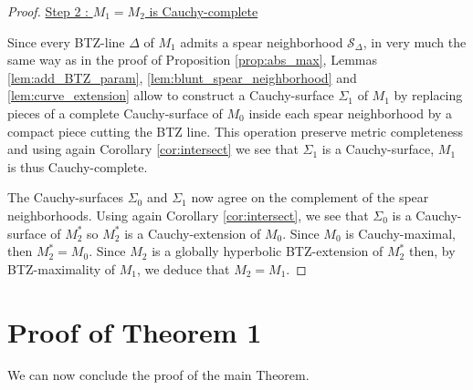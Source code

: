 \documentclass[a4paper,12pt]{article}
\def\S{\mathcal S}
\def\S{\mathcal{S}}
\begin{document}
\begin{proof}
				  \item \underline{Step 2 : $M_1=M_2$ is Cauchy-complete}
				  
				  Since every BTZ-line $\Delta$ of $M_1$ admits a spear neighborhood 
				  $\S_{\Delta}$, in very much the same way as in the proof of Proposition \ref{prop:abs_max}, Lemmas \ref{lem:add_BTZ_param}, \ref{lem:blunt_spear_neighborhood} and \ref{lem:curve_extension}  allow to construct a Cauchy-surface $\Sigma_1$ of $M_1$ by replacing pieces of a complete Cauchy-surface of $M_0$ inside each spear neighborhood by a compact piece cutting the BTZ line. This operation preserve metric completeness and using again Corollary  \ref{cor:intersect} we see that $\Sigma_1$ is a Cauchy-surface, $M_1$ is thus Cauchy-complete.
				  
                  The Cauchy-surfaces $\Sigma_0$ and $\Sigma_1$ now agree on the complement of the spear neighborhoods. Using again Corollary \ref{cor:intersect}, we see that $\Sigma_0$ is a Cauchy-surface of $M_2^*$ so $M_2^*$ is a Cauchy-extension of $M_0$. Since $M_0$ is Cauchy-maximal, then $M_2^*=M_0$. Since $M_2$ is a globally hyperbolic BTZ-extension of $M_2^*$ then, by BTZ-maximality of $M_1$, we deduce that $M_2= M_1$.
				  
				  
				  
				  
				  
				  
				  
				  
				  
				  
				  
				  

				
				  
				  
				  
				  
				  
				  
				  
				  
				  
				  
				  
				\end{proof}

				

				
			

\section{Proof of Theorem 1}
We can now conclude the proof of the main Theorem.
\setcounter{theo}{0}
\end{document}
